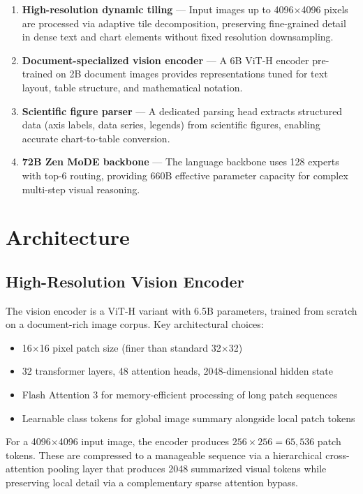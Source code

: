 \documentclass[11pt,a4paper]{article}
\begin{document}
\begin{enumerate}
\item \textbf{High-resolution dynamic tiling} --- Input images up to 4096$\times$4096
      pixels are processed via adaptive tile decomposition, preserving fine-grained
      detail in dense text and chart elements without fixed resolution downsampling.
\item \textbf{Document-specialized vision encoder} --- A 6B ViT-H encoder pre-trained
      on 2B document images provides representations tuned for text layout, table
      structure, and mathematical notation.
\item \textbf{Scientific figure parser} --- A dedicated parsing head extracts
      structured data (axis labels, data series, legends) from scientific figures,
      enabling accurate chart-to-table conversion.
\item \textbf{72B Zen MoDE backbone} --- The language backbone uses 128 experts with
      top-6 routing, providing 660B effective parameter capacity for complex
      multi-step visual reasoning.
\end{enumerate}

\section{Architecture}
\label{sec:arch}

\subsection{High-Resolution Vision Encoder}

The vision encoder is a ViT-H variant with 6.5B parameters, trained from scratch
on a document-rich image corpus. Key architectural choices:

\begin{itemize}
\item 16$\times$16 pixel patch size (finer than standard 32$\times$32)
\item 32 transformer layers, 48 attention heads, 2048-dimensional hidden state
\item Flash Attention 3 for memory-efficient processing of long patch sequences
\item Learnable class tokens for global image summary alongside local patch tokens
\end{itemize}

For a 4096$\times$4096 input image, the encoder produces $256 \times 256 = 65{,}536$
patch tokens. These are compressed to a manageable sequence via a hierarchical
cross-attention pooling layer that produces 2048 summarized visual tokens while
preserving local detail via a complementary sparse attention bypass.
\end{document}
